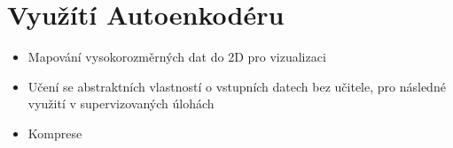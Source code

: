\section{Využítí Autoenkodéru}

\begin{itemize}
    \item Mapování vysokorozměrných dat do 2D pro vizualizaci
    \item Učení se abstraktních vlastností o vstupních datech bez učitele, pro následné využití v supervizovaných úlohách
    \item Komprese
\end{itemize}